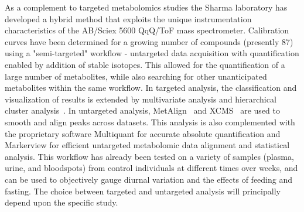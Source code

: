 \documentclass[arial,11pt]{article}
\begin{document}
%
As a complement to targeted metabolomics studies the Sharma laboratory has developed a hybrid method that exploits the unique instrumentation characteristics of the AB/Sciex 5600 QqQ/ToF mass spectrometer.  Calibration curves have been determined for a growing number of compounds (presently 87) using a "semi-targeted" workflow \-- untargeted data acquisition with quantification enabled by addition of stable isotopes. This allowed for the quantification of a large number of metabolites, while also searching for other unanticipated metabolites within the same workflow.  In targeted analysis, the classification and visualization of results is extended by multivariate analysis and hierarchical cluster analysis~\cite{sumner07}. In untargeted analysis, MetAlign~\cite{sumner07} and XCMS~\cite{benton08} are used to smooth and align peaks across datasets. This analysis is also complemented with the proprietary software Multiquant for accurate absolute quantification and Markerview for efficient untargeted metabolomic data alignment and statistical analysis. This workflow has already been tested on a variety of samples (plasma, urine, and bloodspots) from control individuals at different times over weeks, and can be used to objectively gauge diurnal variation and the effects of feeding and fasting.
%
The choice between targeted and untargeted analysis will principally depend upon the specific study.
\end{document}

